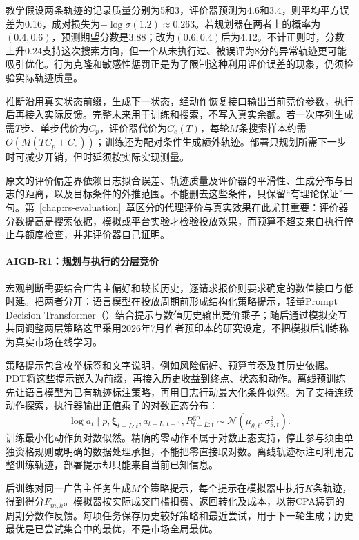 教学假设两条轨迹的记录质量分别为5和3，评价器预测为4.6和3.4，则平均平方误差为0.16，成对损失为$-\log\sigma(1.2)\approx0.263$。若规划器在两者上的概率为$(0.4,0.6)$，预测期望分数是3.88；改为$(0.6,0.4)$后为4.12。不计正则时，分数上升0.24支持这次搜索方向，但一个从未执行过、被误评为8分的异常轨迹更可能吸引优化。行为克隆和敏感性惩罚正是为了限制这种利用评价误差的现象，仍须检验实际轨迹质量。

推断沿用真实状态前缀，生成下一状态，经动作恢复接口输出当前竞价参数，执行后再接入实际反馈。完整未来用于训练和搜索，不写入真实余额。若一次序列生成需$T$步、单步代价为$C_p$，评价器代价为$C_e(T)$，每轮$M$条搜索样本约需$O(M(TC_p+C_e))$；训练还为配对条件生成额外轨迹。部署只规划所需下一步时可减少开销，但时延须按实际实现测量。

原文的评价偏差界依赖日志拟合误差、轨迹质量及评价器的平滑性、生成分布与日志的距离，以及目标条件的外推范围。不能删去这些条件，只保留“有理论保证”一句。第~\ref{chap:rs-evaluation}~章区分的代理评价与真实效果在此尤其重要：评价器分数提高是搜索依据，模拟或平台实验才检验投放效果，而预算不超支来自执行停止与额度检查，并非评价器自己证明。

\paragraph{AIGB-R1：规划与执行的分层竞价}
\label{sec:rs-advertising-r1}

宏观判断需要结合广告主偏好和较长历史，逐请求报价则要求确定的数值接口与低时延。把两者分开：语言模型在投放周期前形成结构化策略提示，轻量Prompt Decision Transformer（）结合提示与数值历史输出竞价乘子；随后通过模拟交互共同调整两层策略这里采用2026年7月作者预印本的研究设定，不把模拟后训练称为真实市场在线学习。

策略提示包含枚举标签和文字说明，例如风险偏好、预算节奏及其历史依据。PDT将这些提示嵌入为前缀，再接入历史收益到终点、状态和动作。离线预训练先让语言模型为已有轨迹标注策略，再用日志行动最大化条件似然。为了支持连续动作探索，执行器输出正值乘子的对数正态分布：
\[
  \log a_t\mid p,\bm{\xi}_{t-L:t},a_{t-L:t-1},R_{t-L:t}^{\mathrm{go}}
       \sim\mathcal N(\mu_{\theta,t},\sigma_{\theta,t}^2).
\]
训练最小化动作负对数似然。精确的零动作不属于对数正态支持，停止参与须由单独资格规则或明确的数据处理承担，不能把零直接取对数。离线轨迹标注可利用完整训练轨迹，部署提示却只能来自当前已知信息。

后训练对同一广告主任务生成$M$个策略提示，每个提示在模拟器中执行$K$条轨迹，得到得分$F_{m,k}$。模拟器按实际成交门槛扣费、返回转化及成本，以带CPA惩罚的周期分数作反馈。每项任务保存历史较好策略和最近尝试，用于下一轮生成；历史最优是已尝试集合中的最优，不是市场全局最优。

